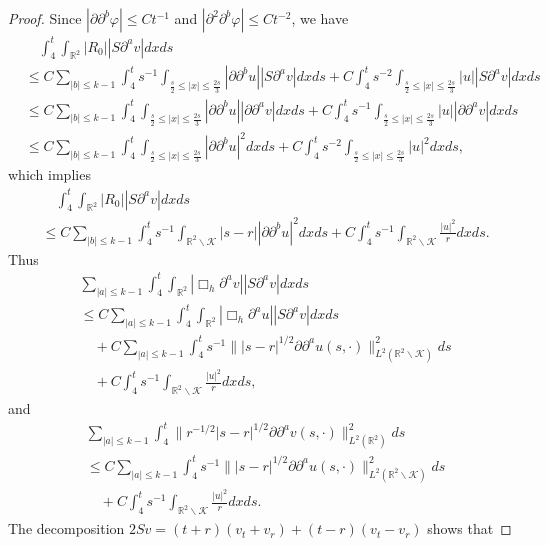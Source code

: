 \documentclass[11pt, reqno]{amsart}
\theoremstyle{definition}
\theoremstyle{remark}
\theoremstyle{definition}
\numberwithin{equation}{section}
\numberwithin{equation}{section}
\def\leq{\leqslant}
\begin{document}
\begin{proof}
Since $|\partial\partial^b\varphi|\leq Ct^{-1}$ and $|\partial^2\partial^b\varphi|\leq Ct^{-2}$, we have
\begin{align*}
&\quad\int_4^t\int_{\mathbb R^2}|R_0||S\partial^av|dxds
\\&\leq C\sum_{|b|\leq k-1}\int_4^ts^{-1}\int_{\frac s2\leq |x|\leq \frac{2s}3}|\partial \partial^bu||S\partial^av|dxds
+C\int_4^ts^{-2}\int_{\frac s2\leq |x|\leq \frac{2s}3}|u||S\partial^av|dxds
\\&\leq C\sum_{|b|\leq k-1}\int_4^t\int_{\frac s2\leq |x|\leq \frac{2s}3}|\partial \partial^bu||\partial\partial^av|dxds
+C\int_4^ts^{-1}\int_{\frac s2\leq |x|\leq \frac{2s}3}|u||\partial\partial^av|dxds
\\&\leq C\sum_{|b|\leq k-1}\int_4^t\int_{\frac s2\leq |x|\leq \frac{2s}3}|\partial \partial^bu|^2dxds
+C\int_4^ts^{-2}\int_{\frac s2\leq |x|\leq \frac{2s}3}|u|^2dxds,
\end{align*}
which implies
\begin{align*}
&\quad\int_4^t\int_{\mathbb R^2}|R_0||S\partial^av|dxds
\\&\leq C\sum_{|b|\leq k-1}\int_4^ts^{-1}\int_{\mathbb R^2\backslash\mathcal{K}}|s-r||\partial \partial^bu|^2dxds
+C\int_4^ts^{-1}\int_{\mathbb R^2\backslash\mathcal{K}}\frac{|u|^2}rdxds.
\end{align*}
Thus
\begin{align}\label{Y33}
&\sum_{|a|\leq k-1}\int_4^t\int_{\mathbb R^2}|\Box_h\partial^av|
|S\partial^av|dxds\nonumber\\&\leq C\sum_{|a|\leq
k-1}\int_4^t\int_{\mathbb R^2}|\Box_h\partial^au|
|S\partial^av|dxds\nonumber\\&\quad+C\sum_{|a|\leq
k-1}\int_4^ts^{-1}\||s-r|^{1/2}\partial\partial^au(s,\cdot)\|_{L^2(\mathbb
R^2\backslash\mathcal {K})}^2ds
\nonumber\\&\quad+C\int_4^ts^{-1}\int_{\mathbb R^2\backslash\mathcal{K}}\frac{|u|^2}rdxds,
\end{align}
and
\begin{align}\label{Y36}
&\sum_{|a|\leq
k-1}\int_4^t\|r^{-1/2}|s-r|^{1/2}\partial\partial^av(s,\cdot)\|^2_{L^2(\mathbb
R^2)}ds \nonumber\\&\leq C\sum_{|a|\leq
k-1}\int_4^ts^{-1}\||s-r|^{1/2}\partial\partial^au(s,\cdot)\|_{L^2(\mathbb
R^2\backslash\mathcal {K})}^2ds
\nonumber\\&\quad+C\int_4^ts^{-1}\int_{\mathbb R^2\backslash\mathcal{K}}\frac{|u|^2}rdxds.
\end{align}
The decomposition $2Sv=(t+r)(v_t+v_r)+(t-r)(v_t-v_r)$ shows that

\end{proof}
\end{document}
